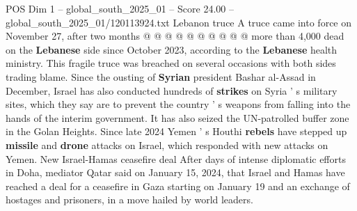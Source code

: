 \begin{textsample}{POS Dim 1 – global\_south\_2025\_01 – Score 24.00 – global\_south\_2025\_01/120113924.txt}
Lebanon truce A truce came into force on November 27, after two months @ @ @ @ @ @ @ @ @ @ more than 4,000 dead on the \textbf{Lebanese} side since October 2023, according to the \textbf{Lebanese} health ministry.
This fragile truce was breached on several occasions with both sides trading blame.
Since the ousting of \textbf{Syrian} president Bashar al-Assad in December, Israel has also conducted hundreds of \textbf{strikes} on Syria ' s military sites, which they say are to prevent the country ' s weapons from falling into the hands of the interim government.
It has also seized the UN-patrolled buffer zone in the Golan Heights.
Since late 2024 Yemen ' s Houthi \textbf{rebels} have stepped up \textbf{missile} and \textbf{drone} attacks on Israel, which responded with new attacks on Yemen.
New Israel-Hamas ceasefire deal After days of intense diplomatic efforts in Doha, mediator Qatar said on January 15, 2024, that Israel and Hamas have reached a deal for a ceasefire in Gaza starting on January 19 and an exchange of hostages and prisoners, in a move hailed by world leaders.

\end{textsample}
